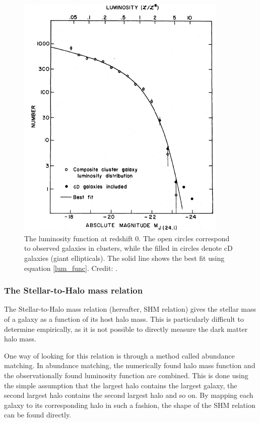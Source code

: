 \begin{figure}
    \centering
    \includegraphics[width=0.9\textwidth]{images/luminosity_function.png}
    \caption{The luminosity function at redshift 0. The open circles correspond to observed galaxies in clusters, while the filled in circles denote cD galaxies (giant ellipticals). The solid line shows the best fit using equation \ref{lum_func}. Credit: \textcite{Schechter1976}.}
    \label{luminosity_function}
\end{figure}

\subsubsection{The Stellar-to-Halo mass relation}

The Stellar-to-Halo mass relation (hereafter, SHM relation) gives the stellar mass of a galaxy as a function of its host halo mass. This is particularly difficult to determine empirically, as it is not possible to directly measure the dark matter halo mass.

One way of looking for this relation is through a method called abundance matching. In abundance matching, the numerically found halo mass function and the observationally found luminosity function are combined. This is done using the simple assumption that the largest halo contains the largest galaxy, the second largest halo contains the second largest halo and so on. By mapping each galaxy to its corresponding halo in such a fashion, the shape of the SHM relation can be found directly.


